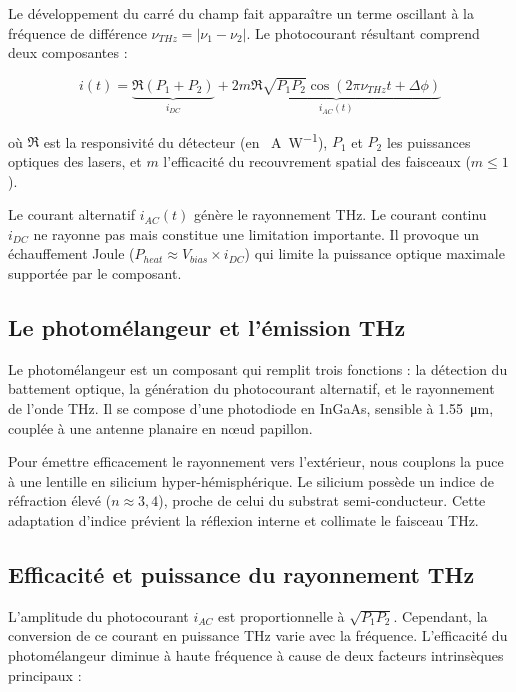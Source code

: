 Le développement du carré du champ fait apparaître un terme oscillant à la fréquence de différence $\nu_{THz} = |\nu_1 - \nu_2|$. Le photocourant résultant comprend deux composantes :

\begin{equation}
i(t) = \underbrace{\Re (P_1 + P_2)}_{i_{DC}} + \underbrace{2m\Re\sqrt{P_1 P_2} \cos(2\pi\nu_{THz}t + \Delta\phi)}_{i_{AC}(t)}
\end{equation}

où $\Re$ est la responsivité du détecteur (en \SI{}{\ampere\per\watt}), $P_1$ et $P_2$ les puissances optiques des lasers, et $m$ l'efficacité du recouvrement spatial des faisceaux ($m \le 1$).

Le courant alternatif $i_{AC}(t)$ génère le rayonnement THz. Le courant continu $i_{DC}$ ne rayonne pas mais constitue une limitation importante. Il provoque un échauffement Joule ($P_{heat} \approx V_{bias} \times i_{DC}$) qui limite la puissance optique maximale supportée par le composant.

\subsection{Le photomélangeur et l'émission THz}

Le photomélangeur est un composant qui remplit trois fonctions : la détection du battement optique, la génération du photocourant alternatif, et le rayonnement de l'onde THz. Il se compose d'une photodiode en InGaAs, sensible à \SI{1,55}{\micro\meter}, couplée à une antenne planaire en nœud papillon.

Pour émettre efficacement le rayonnement vers l'extérieur, nous couplons la puce à une lentille en silicium hyper-hémisphérique. Le silicium possède un indice de réfraction élevé ($n \approx 3,4$), proche de celui du substrat semi-conducteur. Cette adaptation d'indice prévient la réflexion interne et collimate le faisceau THz.

\subsection{Efficacité et puissance du rayonnement THz}

L'amplitude du photocourant $i_{AC}$ est proportionnelle à $\sqrt{P_1 P_2}$. Cependant, la conversion de ce courant en puissance THz varie avec la fréquence. L'efficacité du photomélangeur diminue à haute fréquence à cause de deux facteurs intrinsèques principaux :

